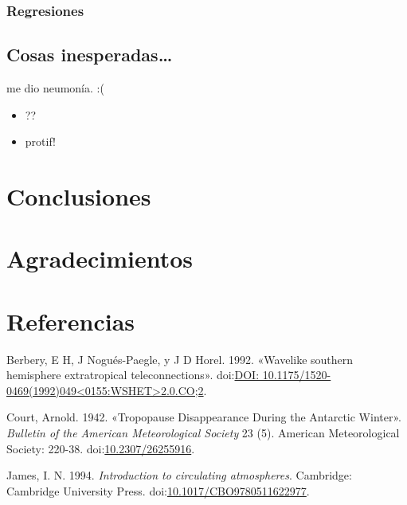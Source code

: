 \documentclass[spanish,a4paper]{book}
\providecommand{\tightlist}{%
  \setlength{\itemsep}{0pt}\setlength{\parskip}{0pt}}
\begin{document}
\subsection{Regresiones}\label{regresiones-1}


\section{Cosas inesperadas\ldots{}}\label{cosas-inesperadas}

me dio neumonía. :(

\begin{itemize}
\tightlist
\item
  ??
\item
  protif!
\end{itemize}

\chapter{Conclusiones}\label{conclusiones}

\chapter{Agradecimientos}\label{agradecimientos}

\chapter*{Referencias}\label{referencias}

\hypertarget{refs}{}
\hypertarget{ref-Berbery1992}{}
Berbery, E H, J Nogués-Paegle, y J D Horel. 1992. «Wavelike southern
hemisphere extratropical teleconnections».
doi:\href{https://doi.org/DOI:\%2010.1175/1520-0469(1992)049\%3C0155:WSHET\%3E2.0.CO;2}{DOI: 10.1175/1520-0469(1992)049\textless{}0155:WSHET\textgreater{}2.0.CO;2}.

\hypertarget{ref-Court1942}{}
Court, Arnold. 1942. «Tropopause Disappearance During the Antarctic
Winter». \emph{Bulletin of the American Meteorological Society} 23 (5).
American Meteorological Society: 220-38.
doi:\href{https://doi.org/10.2307/26255916}{10.2307/26255916}.

\hypertarget{ref-James}{}
James, I. N. 1994. \emph{Introduction to circulating atmospheres}.
Cambridge: Cambridge University Press.
doi:\href{https://doi.org/10.1017/CBO9780511622977}{10.1017/CBO9780511622977}.
\end{document}
